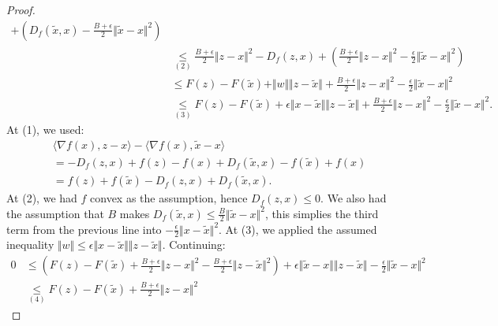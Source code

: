 \documentclass[12pt]{article}
\begin{document}
\begin{proof}
\begin{align*}
                + \left(
                    D_f(\tilde x, x)
                    - \frac{B + \epsilon}{2}\Vert \tilde x - x\Vert^2
                \right)
            \\
            &\underset{(2)}{\le} 
            \frac{B + \epsilon}{2}\Vert z - x\Vert^2 - D_f(z, x)
            + \left(
                \frac{B + \epsilon}{2}\Vert z - x\Vert^2
                - \frac{\epsilon}{2}\Vert \tilde x - x\Vert^2
            \right)
            \\
            &\le
            F(z) - F(\tilde x) + \Vert w \Vert\Vert z - \tilde x\Vert
            + \frac{B + \epsilon}{2}\Vert z - x\Vert^2
            - \frac{\epsilon}{2}\Vert \tilde x - x\Vert^2
            \\
            &\underset{(3)}{\le}
            F(z) - F(\tilde x) 
            + \epsilon\Vert x - \tilde x\Vert\Vert z - \tilde x\Vert
            + \frac{B + \epsilon}{2}\Vert z - x\Vert^2
            - \frac{\epsilon}{2}\Vert \tilde x - x\Vert^2. 
        \end{align*}
        At (1), we used: 
        \begin{align*}
            & \langle \nabla f(x), z - x\rangle
            - \langle \nabla f(x), \tilde x - x\rangle
            \\
            &= 
            - D_f(z, x) + f(z) - f(x)
            + D_f(\tilde x, x) - f(\tilde x) + f(x)
            \\
            &= f(z) + f(\tilde x) - D_f(z, x) + D_f(\tilde x , x). 
        \end{align*}
        At (2), we had $f$ convex as the assumption, hence $D_f(z, x) \le 0$. 
        We also had the assumption that $B$ makes $D_f(\tilde x, x) \le \frac{B}{2}\Vert \tilde x - x\Vert^2$, this simplies the third term from the previous line into $- \frac{\epsilon}{2}\Vert x - \tilde x\Vert^2$. 
        At (3), we applied the assumed inequality $\Vert w\Vert \le \epsilon \Vert x - \tilde x\Vert \Vert z - \tilde x\Vert$. 
        Continuing: 
        \begin{align*}
            0 &\le
            \left(
                F(z) - F(\tilde x) + \frac{B + \epsilon}{2}\Vert z - x\Vert^2
                - \frac{B + \epsilon}{2}\Vert z - \tilde x\Vert^2 
            \right)
            + \epsilon \Vert \tilde x - x\Vert \Vert z - \tilde x\Vert
            - \frac{\epsilon}{2}\Vert \tilde x - x\Vert^2
            \\
            &\underset{(4)}{\le} 
            F(z) - F(\tilde x) + \frac{B + \epsilon}{2}\Vert z - x\Vert^2

\end{align*}
\end{proof}
\end{document}
